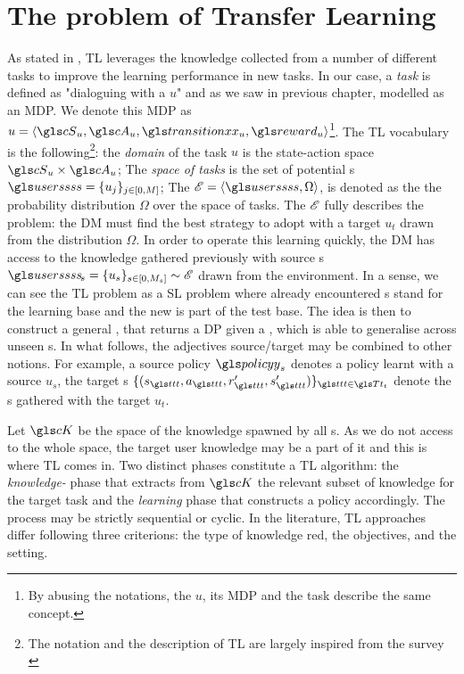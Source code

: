\section{The problem of Transfer Learning}

As stated in \textcite{LazaricSurvey}, \gls{TL} leverages the knowledge collected from a number of different tasks to improve the learning performance in new tasks. In our case, a \textit{task} is defined as "dialoguing with a  $u$" and as we saw in previous chapter, modelled as an \gls{MDP}. We denote this \gls{MDP} as $u =\left\langle \cS_{u}, \cA_{u}, \transition_{u}, \reward_{u}\right\rangle$\footnote{By abusing the notations, the  $u$, its \gls{MDP} and the task describe the same concept.}. The \gls{TL} vocabulary is the following\footnote{The notation and the description of \gls{TL} are largely inspired from the survey \textcite{LazaricSurvey}}: the \textit{domain} of the task $u$ is the state-action space $\cS_{u} \times \cA_{u}$; The \textit{space of tasks} is the set of potential s $\users = \{u_j\}_{j\in[0,M]}$; The \textit{} $\rE=\langle\users, \Omega\rangle$, is denoted as the the probability distribution $\Omega$ over the space of tasks. The  $\mathscr{E}$ fully describes the problem: the \gls{DM} must find the best strategy to adopt with a target  $u_t$ drawn from the distribution $\Omega$. In order to operate this learning quickly, the \gls{DM} has access to the knowledge gathered previously with source s $\users_{\!s} =\{u_s\}_{s\in[0,M_s]}  \sim \rE$ drawn from the environment. In a sense, we can see the \gls{TL} problem as a \gls{SL} problem where already encountered s stand for the learning base and the new  is part of the test base. The idea is then to construct a general , that returns a \gls{DP} given a , which is able to generalise across unseen s. In what follows, the adjectives source/target may be combined to other notions. For example, a source policy $\policy_s$ denotes a policy learnt with a source  $u_s$, the target s $\{(s_{\indextransition},a_{\indextransition},r_{\indextransition}',s_{\indextransition}')\}_{{\indextransition}\in \T_t}$ denote the s gathered with the target  $u_t$.

Let $\cK$ be the space of the knowledge spawned by all s. As we do not access to the whole space, the target user knowledge may be a part of it and this is where \gls{TL} comes in. Two distinct phases constitute a \gls{TL} algorithm: the \textit{knowledge-} phase that extracts from $\cK$ the relevant subset of knowledge for the target task and the \textit{learning} phase that constructs a policy accordingly. The process may be strictly sequential or cyclic. In the literature, \gls{TL} approaches differ following three criterions: the type of knowledge red, the objectives, and the setting.

